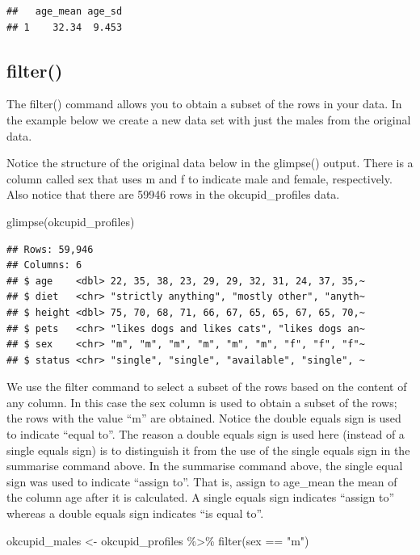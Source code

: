 \documentclass[
]{krantz}
\makeatletter
\newenvironment{Shaded}{\begin{snugshade}}{\end{snugshade}}
\newcommand{\FunctionTok}[1]{\textcolor[rgb]{0,0,0}{#1}}
\newcommand{\NormalTok}[1]{#1}
\newcommand{\OtherTok}[1]{\textcolor[rgb]{0.37,0.37,0.37}{#1}}
\newcommand{\SpecialCharTok}[1]{\textcolor[rgb]{0,0,0}{#1}}
\newcommand{\StringTok}[1]{\textcolor[rgb]{0.5,0.5,0.5}{#1}}
\newenvironment{kframe}{%
\medskip{}
\setlength{\fboxsep}{.8em}
 \def\at@end@of@kframe{}%
 \ifinner\ifhmode%
  \def\at@end@of@kframe{\end{minipage}}%
  \begin{minipage}{\columnwidth}%
 \fi\fi%
 \def\FrameCommand##1{\hskip\@totalleftmargin \hskip-\fboxsep
 \colorbox{shadecolor}{##1}\hskip-\fboxsep
     \hskip-\linewidth \hskip-\@totalleftmargin \hskip\columnwidth}%
 \MakeFramed {\advance\hsize-\width
   \@totalleftmargin\z@ \linewidth\hsize
   \@setminipage}}%
 {\par\unskip\endMakeFramed%
 \at@end@of@kframe}
\renewenvironment{Shaded}{\begin{kframe}}{\end{kframe}}
\makeatother
\begin{document}
\begin{verbatim}
##   age_mean age_sd
## 1    32.34  9.453
\end{verbatim}

\hypertarget{filter}{%
\subsection{filter()}\label{filter}}

The filter() command allows you to obtain a subset of the rows in your data. In the example below we create a new data set with just the males from the original data.

Notice the structure of the original data below in the glimpse() output. There is a column called sex that uses m and f to indicate male and female, respectively. Also notice that there are 59946 rows in the okcupid\_profiles data.

\begin{Shaded}
\begin{Highlighting}[]
\FunctionTok{glimpse}\NormalTok{(okcupid\_profiles)}
\end{Highlighting}
\end{Shaded}

\begin{verbatim}
## Rows: 59,946
## Columns: 6
## $ age    <dbl> 22, 35, 38, 23, 29, 29, 32, 31, 24, 37, 35,~
## $ diet   <chr> "strictly anything", "mostly other", "anyth~
## $ height <dbl> 75, 70, 68, 71, 66, 67, 65, 65, 67, 65, 70,~
## $ pets   <chr> "likes dogs and likes cats", "likes dogs an~
## $ sex    <chr> "m", "m", "m", "m", "m", "m", "f", "f", "f"~
## $ status <chr> "single", "single", "available", "single", ~
\end{verbatim}

We use the filter command to select a subset of the rows based on the content of any column. In this case the sex column is used to obtain a subset of the rows; the rows with the value ``m'' are obtained. Notice the double equals sign is used to indicate ``equal to''. The reason a double equals sign is used here (instead of a single equals sign) is to distinguish it from the use of the single equals sign in the summarise command above. In the summarise command above, the single equal sign was used to indicate ``assign to''. That is, assign to age\_mean the mean of the column age after it is calculated. A single equals sign indicates ``assign to'' whereas a double equals sign indicates ``is equal to''.

\begin{Shaded}
\begin{Highlighting}[]
\NormalTok{okcupid\_males }\OtherTok{\textless{}{-}}\NormalTok{ okcupid\_profiles }\SpecialCharTok{\%\textgreater{}\%}
  \FunctionTok{filter}\NormalTok{(sex }\SpecialCharTok{==} \StringTok{"m"}\NormalTok{)}
\end{Highlighting}
\end{Shaded}
\end{document}
